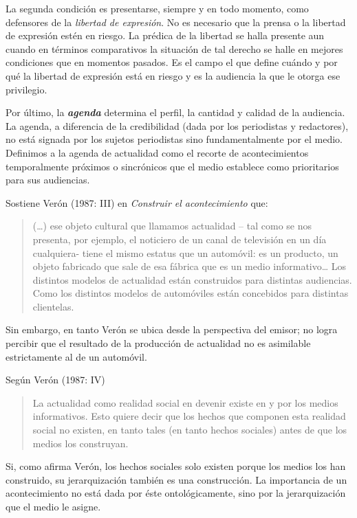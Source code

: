 La segunda condición es presentarse, siempre y en todo momento, como defensores de la \emph{libertad de expresión}. No es necesario que la prensa o la libertad de expresión estén en riesgo. La prédica de la libertad se halla presente aun cuando en términos comparativos la situación de tal derecho se halle en mejores condiciones que en momentos pasados. Es el campo el que define cuándo y por qué la libertad de expresión está en riesgo y es la audiencia la que le otorga ese privilegio.

Por último, la \emph{\textbf{agenda}} determina el perfil, la cantidad y calidad de la audiencia. La agenda, a diferencia de la credibilidad (dada por los periodistas y redactores), no está signada por los sujetos periodistas sino fundamentalmente por el medio. Definimos a la agenda de actualidad como el recorte de acontecimientos temporalmente próximos o sincrónicos que el medio establece como prioritarios para sus audiencias.

Sostiene Verón (1987: III) en \emph{Construir el acontecimiento} que:

\begin{quote}
(\ldots) ese objeto cultural que llamamos actualidad -- tal como se nos presenta, por ejemplo, el noticiero de un canal de televisión en un día cualquiera- tiene el mismo estatus que un automóvil: es un producto, un objeto fabricado que sale de esa fábrica que es un medio informativo\ldots{} Los distintos modelos de actualidad están construidos para distintas audiencias. Como los distintos modelos de automóviles están concebidos para distintas clientelas.
\end{quote}

Sin embargo, en tanto Verón se ubica desde la perspectiva del emisor; no logra percibir que el resultado de la producción de actualidad no es asimilable estrictamente al de un automóvil.

Según Verón (1987: IV)

\begin{quote}
La actualidad como realidad social en devenir existe en y por los medios informativos. Esto quiere decir que los hechos que componen esta realidad social no existen, en tanto tales (en tanto hechos sociales) antes de que los medios los construyan.
\end{quote}

Si, como afirma Verón, los hechos sociales solo existen porque los medios los han construido, su jerarquización también es una construcción. La importancia de un acontecimiento no está dada por éste ontológicamente, sino por la jerarquización que el medio le asigne.

